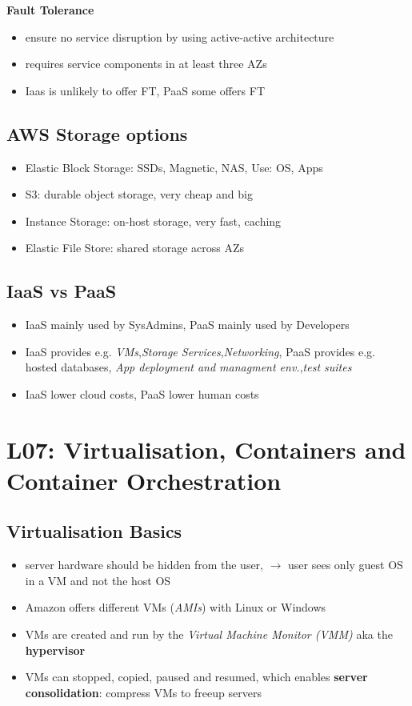 \documentclass[a4paper]{article}
\begin{document}
\begin{multicols}{3}
\textbf{Fault Tolerance}
\begin{itemize}
    \item ensure no service disruption by using active-active architecture
    \item requires service components in at least three AZs
    \item Iaas is unlikely to offer FT, PaaS some offers FT
\end{itemize}

\subsection*{AWS Storage options}
\begin{itemize}
    \item Elastic Block Storage: SSDs, Magnetic, NAS, Use: OS, Apps
    \item S3: durable object storage, very cheap and big
    \item Instance Storage: on-host storage, very fast, caching
    \item Elastic File Store: shared storage across AZs
\end{itemize}

\subsection*{IaaS vs PaaS}
\begin{itemize}
    \item IaaS mainly used by SysAdmins, PaaS mainly used by Developers
    \item IaaS provides e.g. \textit{VMs},\textit{Storage Services},\textit{Networking}, PaaS provides e.g. hosted databases, \textit{App deployment and managment env.},\textit{test suites}
    \item IaaS lower cloud costs, PaaS lower human costs
\end{itemize}

\section*{L07: Virtualisation, Containers and Container Orchestration}

\subsection*{Virtualisation Basics}
\begin{itemize}
    \item server hardware should be hidden from the user, $\rightarrow$ user sees only guest OS in a VM and not the host OS
    \item Amazon offers different VMs (\textit{AMIs}) with Linux or Windows
    \item VMs are created and run by the \textit{Virtual Machine Monitor (VMM)} aka the \textbf{hypervisor}
    \item VMs can stopped, copied, paused and resumed, which enables \textbf{server consolidation}: compress VMs to freeup servers
\end{itemize}


\end{multicols}
\end{document}
